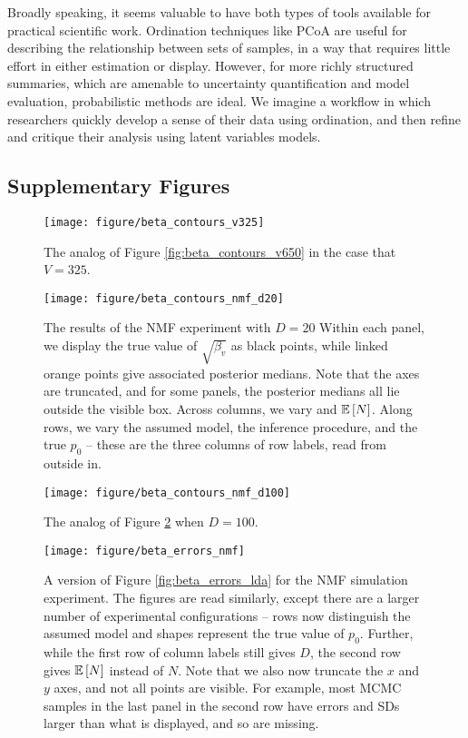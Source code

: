 \documentclass[oupdraft]{bio}
\begin{document}
Broadly speaking, it seems valuable to have both types of tools available for
practical scientific work. Ordination techniques like PCoA are useful for
describing the relationship between sets of samples, in a way that requires
little effort in either estimation or display. However, for more richly
structured summaries, which are amenable to uncertainty quantification and model
evaluation, probabilistic methods are ideal. We imagine a workflow in which
researchers quickly develop a sense of their data using ordination, and then
refine and critique their analysis using latent variables models.

\subsection{Supplementary Figures}

\begin{figure}[!p]
  \centering
  \texttt{[image: figure/beta\_contours\_v325]}
  \caption{The analog of Figure \ref{fig:beta_contours_v650} in the case that $V
    = 325$. \label{fig:beta_contours_v325}}
\end{figure}

\begin{figure}[!p]
  \centering
  \texttt{[image: figure/beta\_contours\_nmf\_d20]}
  \caption{The results of the NMF experiment with $D = 20$ Within each panel, we
    display the true value of $\sqrt{\beta_{v}}$ as black points, while linked
    orange points give associated posterior medians. Note that the axes are
    truncated, and for some panels, the posterior medians all lie outside the
    visible box. Across columns, we vary and $\mathbb{E}\left[{N}\right]$. Along rows, we vary the
    assumed model, the inference procedure, and the true $p_{0}$ -- these are
    the three columns of row labels, read from outside
    in.\label{fig:beta_contours_nmf_d20}}
\end{figure}

\begin{figure}[!p]
  \centering
  \texttt{[image: figure/beta\_contours\_nmf\_d100]}
  \caption{The analog of Figure \ref{fig:beta_contours_nmf_d20} when $D = 100$.
  \label{fig:beta_contours_nmf_d100}}
\end{figure}

\begin{figure}[!p]
  \centering
  \texttt{[image: figure/beta\_errors\_nmf]}
  \caption{A version of Figure \ref{fig:beta_errors_lda} for the NMF simulation
    experiment. The figures are read similarly, except there are a larger number
    of experimental configurations -- rows now distinguish the assumed model and
    shapes represent the true value of $p_{0}$. Further, while the first row of
    column labels still gives $D$, the second row gives $\mathbb{E}\left[{N}\right]$ instead of
    $N$. Note that we also now truncate the $x$ and $y$ axes, and not all points
    are visible. For example, most MCMC samples in the last panel in the second
    row have errors and SDs larger than what is displayed, and so are
    missing. \label{fig:beta_errors_nmf}}
\end{figure}
\end{document}
